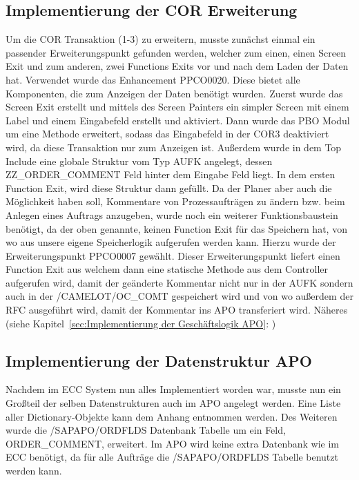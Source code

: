 \subsection{Implementierung der COR Erweiterung}
\label{sec:Implementierung der COR Erweiterung}   
Um die COR Transaktion (1-3) zu erweitern, musste zunächst einmal ein passender Erweiterungspunkt gefunden werden, welcher zum einen, einen Screen Exit und zum anderen, zwei Functions Exits vor und nach dem Laden der Daten hat. Verwendet wurde das Enhancement PPCO0020. Diese bietet alle Komponenten, die zum Anzeigen der Daten benötigt wurden. Zuerst wurde das Screen Exit erstellt und mittels des Screen Painters ein simpler Screen mit einem Label und einem Eingabefeld erstellt und aktiviert. Dann wurde das \ac{PBO} Modul um eine Methode erweitert, sodass das Eingabefeld in der COR3 deaktiviert wird, da diese Transaktion nur zum Anzeigen ist. Außerdem wurde in dem Top Include eine globale Struktur vom Typ AUFK angelegt, dessen ZZ\_ORDER\_COMMENT Feld hinter dem Eingabe Feld liegt. In dem ersten Function Exit, wird diese Struktur dann gefüllt. Da der Planer aber auch die Möglichkeit haben soll, Kommentare von Prozessaufträgen zu ändern bzw. beim Anlegen eines Auftrags anzugeben, wurde noch ein weiterer Funktionsbaustein benötigt, da der oben genannte, keinen Function Exit für das Speichern hat, von wo aus unsere eigene Speicherlogik aufgerufen werden kann. Hierzu wurde der Erweiterungspunkt PPCO0007 gewählt. Dieser Erweiterungspunkt liefert einen Function Exit aus welchem dann eine statische Methode aus dem Controller aufgerufen wird, damit der geänderte Kommentar nicht nur in der AUFK sondern auch in der /CAMELOT/OC\_COMT gespeichert wird und von wo außerdem der \ac{RFC} ausgeführt wird, damit der Kommentar ins \ac{APO} transferiert wird. Näheres (siehe Kapitel~\ref{sec:Implementierung der Geschäftslogik APO}: )

\subsection{Implementierung der Datenstruktur APO}
\label{sec:Implementierung der Datenstruktur APO} 
Nachdem im \ac{ECC} System nun alles Implementiert worden war, musste nun ein Großteil der selben Datenstrukturen auch im \ac{APO} angelegt werden. Eine Liste aller Dictionary-Objekte kann dem Anhang entnommen werden. Des Weiteren wurde die /SAPAPO/ORDFLDS Datenbank Tabelle um ein Feld, ORDER\_COMMENT, erweitert. Im \ac{APO} wird keine extra Datenbank wie im \ac{ECC} benötigt, da für alle Aufträge die /SAPAPO/ORDFLDS Tabelle benutzt werden kann.

